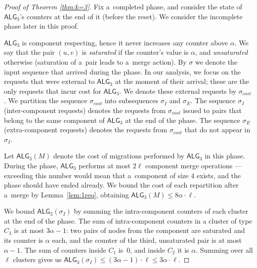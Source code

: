 \documentclass[a4paper,anonymous,USenglish]{lipics-v2019}
\newcommand{\TAlg}{{\ensuremath{\textsf{ALG}_{3}}}\xspace}
\begin{document}

\begin{proof}[Proof of Theorem \ref{thm:k=3}]
	Fix a~completed phase, and consider the state of \TAlg's counters at the end of it (before the reset).
	We consider the incomplete phase later in this proof.
	
	\TAlg is component respecting, hence it never increases any counter above $\alpha$.
	We say that the pair $(u, v)$ is \emph{saturated} if the counter's value is $\alpha$, and \emph{unsaturated} otherwise (saturation of a~pair leads to a~merge action).
	By $\sigma$ we denote the input sequence that arrived during the phase.
	In our analysis, we focus on the requests that were external to \TAlg at the moment of their arrival; these are the only requests that incur cost for \TAlg.
	We denote these external requests by $\sigma_{cost}$.
	We partition the sequence $\sigma_{cost}$ into subsequences $\sigma_I$ and $\sigma_E$.
	The sequence $\sigma_I$ (inter-component requests) denotes the requests from $\sigma_{cost}$ issued to pairs that belong to the same component of \TAlg at the end of the phase.
	The sequence $\sigma_E$ (extra-component requests) denotes the requests from $\sigma_{cost}$ that do not appear in $\sigma_I$.
	
	
	Let $\TAlg(M)$ denote the cost of migrations performed by \TAlg in this phase.
	During the phase, \TAlg performs at most $2 \ell$ component merge operations ---
	exceeding this number would mean that a~component of size $4$ exists, and the phase should have ended already.
	We bound the cost of each repartition after a~merge by Lemma~\ref{lem:1req}, obtaining $\TAlg(M) \leq 8\alpha\cdot\ell$.
	
	We bound $\TAlg(\sigma_I)$ by summing the intra-component counters of each cluster at the end of the phase.
	The sum of intra-component counters in a cluster of type $C_3$ is at most $3 \alpha - 1$: two pairs of nodes from the component are saturated and its counter is $\alpha$ each, and the counter of the third, unsaturated pair is at most $\alpha-1$.
	The sum of counters inside $C_1$ is~$0$, and inside $C_2$ it is $\alpha$.
	Summing over all $\ell$ clusters gives us $\TAlg(\sigma_I) \leq (3 \alpha-1)\cdot \ell \leq 3\alpha\cdot\ell$.
	

\end{proof}
\end{document}
